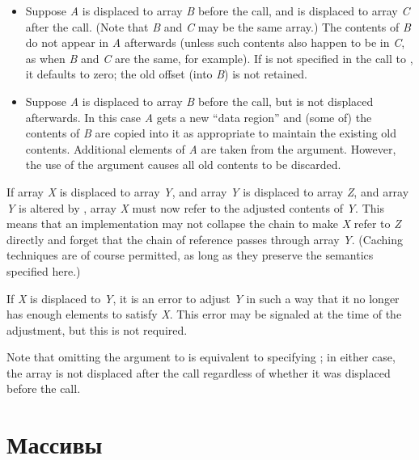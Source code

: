 \begin{defun}[Function]
\begin{newer}
\begin{itemize}
\item
Suppose \emph{A} is displaced to {array \emph{B}} before the call,
and is displaced to array \emph{C} after the call.
(Note that \emph{B} and \emph{C} may be the same array.)
The contents of \emph{B} do not appear in
\emph{A} afterwards (unless such contents also happen to be in \emph{C},
as when \emph{B} and \emph{C} are the same, for example).  If
 is not specified in the call to
, it defaults
to zero; the old offset (into \emph{B}) is not retained.

\item
Suppose \emph{A} is displaced to array \emph{B} before the call,
but is not displaced afterwards.  In this case \emph{A} gets
a new ``data region'' and (some of) the
contents of \emph{B} are copied into it as appropriate to
maintain the existing old contents.  Additional elements of \emph{A}
are taken from the  argument.
However, the use of the  argument causes all old
contents to be discarded.
\end{itemize}

If array \emph{X} is displaced to array \emph{Y}, and array \emph{Y} is displaced
to array \emph{Z}, and array \emph{Y} is altered by , array
\emph{X} must now refer to the adjusted contents of \emph{Y}.  This means that an
implementation may not collapse the chain to make \emph{X} refer to \emph{Z}
directly and forget that the chain of reference passes through array \emph{Y}. 
(Caching techniques are of course permitted, as long as they preserve the
semantics specified here.)

If \emph{X} is displaced to \emph{Y}, it is an error to adjust \emph{Y} in such a
way that it no longer has enough elements to satisfy \emph{X}.  This error may be
signaled at the time of the adjustment, but this is not required.

Note that omitting the  argument to  is
equivalent to specifying ; in either case, the array is
not displaced after the call regardless of whether it was displaced before
the call.
\end{newer}
\end{defun}

\else

\chapter{Массивы}

